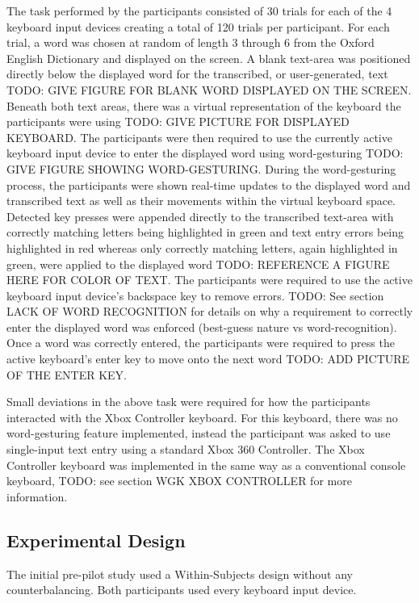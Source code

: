 The task performed by the participants consisted of 30 trials for each of the 4 keyboard input devices creating a total of 120 trials per participant. For each trial, a word was chosen at random of length 3 through 6 from the Oxford English Dictionary and displayed on the screen. A blank text-area was positioned directly below the displayed word for the transcribed, or user-generated, text TODO: GIVE FIGURE FOR BLANK WORD DISPLAYED ON THE SCREEN. Beneath both text areas, there was a virtual representation of the keyboard the participants were using TODO: GIVE PICTURE FOR DISPLAYED KEYBOARD. The participants were then required to use the currently active keyboard input device to enter the displayed word using word-gesturing TODO: GIVE FIGURE SHOWING WORD-GESTURING. During the word-gesturing process, the participants were shown real-time updates to the displayed word and transcribed text as well as their movements within the virtual keyboard space. Detected key presses were appended directly to the transcribed text-area with correctly matching letters being highlighted in green and text entry errors being highlighted in red whereas only correctly matching letters, again highlighted in green, were applied to the displayed word TODO: REFERENCE A FIGURE HERE FOR COLOR OF TEXT. The participants were required to use the active keyboard input device's backspace key to remove errors. TODO: See section LACK OF WORD RECOGNITION for details on why a requirement to correctly enter the displayed word was enforced (best-guess nature vs word-recognition). Once a word was correctly entered, the participants were required to press the active keyboard's enter key to move onto the next word TODO: ADD PICTURE OF THE ENTER KEY.

Small deviations in the above task were required for how the participants interacted with the Xbox Controller keyboard. For this keyboard, there was no word-gesturing feature implemented, instead the participant was asked to use single-input text entry using a standard Xbox 360 Controller. The Xbox Controller keyboard was implemented in the same way as a conventional console keyboard, TODO: see section WGK XBOX CONTROLLER for more information.

\subsection{Experimental Design} \label{pre_experimental_design}

The initial pre-pilot study used a Within-Subjects design without any counterbalancing. Both participants used every keyboard input device.


